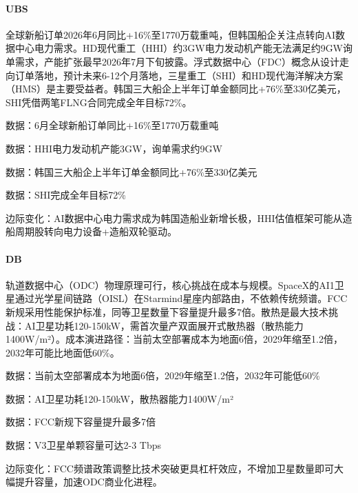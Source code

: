 \documentclass[11pt]{ctexart}
\begin{document}
\paragraph{UBS} 全球新船订单2026年6月同比+16\%至1770万载重吨，但韩国船企关注点转向AI数据中心电力需求。HD现代重工（HHI）约3GW电力发动机产能无法满足约9GW询单需求，产能扩张最早2026年7月下旬披露。浮式数据中心（FDC）概念从设计走向订单落地，预计未来6-12个月落地，三星重工（SHI）和HD现代海洋解决方案（HMS）是主要受益者。韩国三大船企上半年订单金额同比+76\%至330亿美元，SHI凭借两笔FLNG合同完成全年目标72\%。
{\small\color{refgray}数据：6月全球新船订单同比+16\%至1770万载重吨\par}
{\small\color{refgray}数据：HHI电力发动机产能3GW，询单需求约9GW\par}
{\small\color{refgray}数据：韩国三大船企上半年订单金额同比+76\%至330亿美元\par}
{\small\color{refgray}数据：SHI完成全年目标72\%\par}
{\small\color{refgray}边际变化：AI数据中心电力需求成为韩国造船业新增长极，HHI估值框架可能从造船周期股转向电力设备+造船双轮驱动。\par}
\paragraph{DB} 轨道数据中心（ODC）物理原理可行，核心挑战在成本与规模。SpaceX的AI1卫星通过光学星间链路（OISL）在Starmind星座内部路由，不依赖传统频谱。FCC新规采用性能保护标准，同等卫星数量下容量提升最多7倍。散热是最大技术挑战：AI卫星功耗120-150kW，需首次量产双面展开式散热器（散热能力1400W/m²）。成本演进路径：当前太空部署成本为地面6倍，2029年缩至1.2倍，2032年可能比地面低60\%。
{\small\color{refgray}数据：当前太空部署成本为地面6倍，2029年缩至1.2倍，2032年可能低60\%\par}
{\small\color{refgray}数据：AI卫星功耗120-150kW，散热器能力1400W/m²\par}
{\small\color{refgray}数据：FCC新规下容量提升最多7倍\par}
{\small\color{refgray}数据：V3卫星单颗容量可达2-3 Tbps\par}
{\small\color{refgray}边际变化：FCC频谱政策调整比技术突破更具杠杆效应，不增加卫星数量即可大幅提升容量，加速ODC商业化进程。\par}
\end{document}
